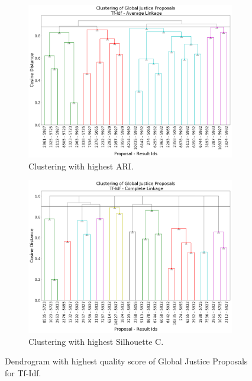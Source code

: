 \begin{figure}[!htpb]
  \begin{subfigure}[b]{0.48\textwidth}   
  \centering 
  \includegraphics[width=\textwidth]{tfidf/BEST_ARI_Global_Justice.png}
  \caption[]%
  {{\small Clustering with highest ARI.}}    
  \label{fig:gj.tfidf.ari}
  \end{subfigure}
  \quad
  \begin{subfigure}[b]{0.48\textwidth}   
  \centering 
  \includegraphics[width=\textwidth]{tfidf/BEST_SIL_Global_Justice.png}
  \caption[]%
  {{\small Clustering with highest Silhouette C.}}    
  \label{fig:gj.tfidf.sil}
  \end{subfigure}
\caption{Dendrogram with highest quality score of Global Justice Proposals for Tf-Idf.}
\label{fig:gj.tfidf.dendro}
\end{figure}

